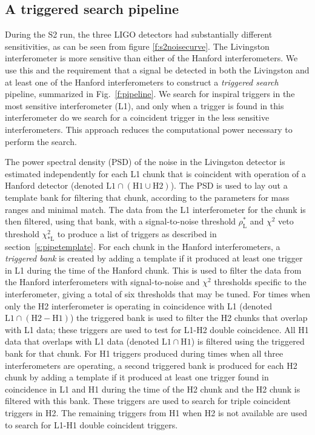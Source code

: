 \subsection{A triggered search pipeline}
\label{ss:triggeredsearch}

During the S2 run, the three LIGO detectors had substantially different
sensitivities, as can be seen from figure \ref{f:s2noisecurve}. The Livingston
interferometer is more sensitive than either of the Hanford interferometers.
We use this and the requirement that a signal be detected in both the
Livingston and at least one of the Hanford interferometers to construct a {\em
triggered search} pipeline, summarized in Fig.~\ref{f:pipeline}. We search for
inspiral triggers in the most sensitive interferometer (L1), and only when a
trigger is found in this interferometer do we search for a coincident trigger
in the less sensitive interferometers. This approach reduces the computational
power necessary to perform the search.

The power spectral density (PSD) of the noise in the Livingston detector is
estimated independently for each L1 chunk that is coincident with operation of
a Hanford detector (denoted $\mathrm{L1} \cap (\mathrm{H1} \cup
\mathrm{H2})$).  The PSD is used to lay out a template bank for filtering that
chunk, according to the parameters for mass ranges and minimal
match\cite{Owen:1998dk}. The data from the L1 interferometer for the chunk is
then filtered, using that bank, with a signal-to-noise threshold
$\rho_{\mathrm{L}}^\ast$ and $\chi^2$ veto threshold $\chi^2_{\ast\mathrm{L}}$
to produce a list of triggers as described in section~\ref{s:pipetemplate}.
For each chunk in the Hanford interferometers, a \emph{triggered bank} is
created by adding a template if it produced at least one trigger in L1 during
the time of the Hanford chunk.  This is used to filter the data from the
Hanford interferometers with signal-to-noise and $\chi^2$ thresholds specific
to the interferometer, giving a total of six thresholds that may be tuned.
For times when only the H2 interferometer is operating in coincidence with L1
(denoted $\mathrm{L1} \cap (\mathrm{H2} - \mathrm{H1})$) the triggered bank is
used to filter the H2 chunks that overlap with L1 data; these triggers are
used to test for L1-H2 double coincidence.  All H1 data that overlaps with L1
data (denoted $\mathrm{L1} \cap \mathrm{H1}$) is filtered using the triggered
bank for that chunk. For H1 triggers produced during times when all three
interferometers are operating, a second triggered bank is produced for each H2
chunk by adding a template if it produced at least one trigger found in
coincidence in L1 and H1 during the time of the H2 chunk and the H2 chunk is
filtered with this bank.  These triggers are used to search for triple
coincident triggers in H2.  The remaining triggers from H1 when H2 is not
available are used to search for L1-H1 double coincident triggers.

